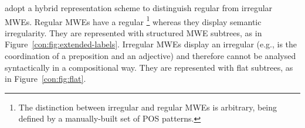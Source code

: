 \documentclass[output=paper]{langsci/langscibook}
\begin{document}
\citet{candito2014strategies} adopt a hybrid representation scheme to distinguish regular from irregular MWEs. Regular MWEs have a regular \footnote{The distinction between irregular and regular MWEs is arbitrary, being defined by a manually-built set of POS patterns.} whereas they display semantic irregularity. They are represented with structured MWE subtrees, as in Figure~\ref{con:fig:extended-labels}. Irregular MWEs display an irregular  (e.g.,  is the coordination of a preposition and an adjective) and therefore cannot be analysed syntactically in a compositional way. They are represented with flat subtrees, as in Figure~\ref{con:fig:flat}.










\end{document}
